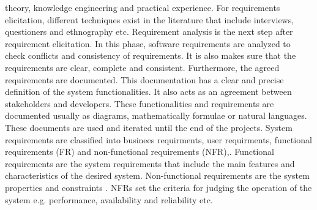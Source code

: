 theory, knowledge engineering and practical experience. For requirements elicitation, different
techniques exist in the literature that include interviews, questioners and ethnography etc.
Requirement analysis \cite{Nuseibeh:2000:RER:336512.336523} is the next step after requirement elicitation. In this phase, software
requirements are analyzed to check conflicts and consistency of requirements. It is also makes
sure that the requirements are clear, complete and consistent. Furthermore, the agreed
requirements are documented. This documentation has a clear and precise definition of the
system functionalities. It also acts as an agreement between stakeholders and developers. These
functionalities and requirements are documented usually as diagrams, mathematically formulae
or natural languages. These documents are used and iterated until the end of the projects.
System requirements are classified into businees requirments, user requirments, functional requirements (FR) 
and non-functional requirements (NFR),. Functional requirements are the system requirements that include the main
features and characteristics of the desired system. Non-functional requirements are the system
properties and constraints \cite{Davis:1993:SRO:113586}. NFRs set the criteria for judging the operation of the system e.g.
performance, availability and reliability etc.
